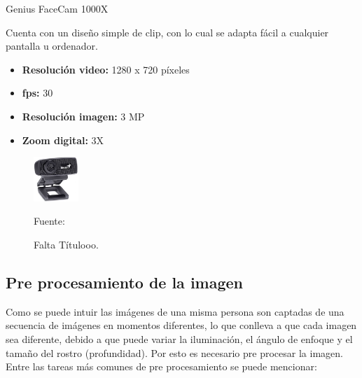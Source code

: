 \begin{enumerate}
{\bf\item[3. ] Genius FaceCam 1000X} \vskip 0.1cm
Cuenta con un diseño simple de clip, con lo cual se adapta fácil a cualquier pantalla u ordenador.
\begin{itemize}
\item[•] {\bf Resolución video:}
1280 x 720 píxeles
\item[•] {\bf fps:}
30
\item[•] {\bf Resolución imagen:}
3 MP
\item[•] {\bf Zoom digital:}
3X
\end{itemize}

\begin{figure}[ht]
\begin{center}
\includegraphics[width=0.15\textwidth]{Imagen11}
\end{center}
\begin{center}
\vskip -0.5cm
\caption{\small{Falta Títulooo.}}
{\small{Fuente: \cite{FALTA}}}
\end{center}
\end{figure}

\end{enumerate}
\vskip 1cm

\subsection{Pre procesamiento de la imagen}
Como se puede intuir las imágenes de una misma persona son captadas de una secuencia de imágenes en momentos diferentes, lo que conlleva a que cada imagen sea diferente, debido a que puede variar la iluminación, el ángulo de enfoque y el tamaño del rostro (profundidad). Por esto es necesario pre procesar la imagen. Entre las tareas más comunes de pre procesamiento se puede mencionar:

